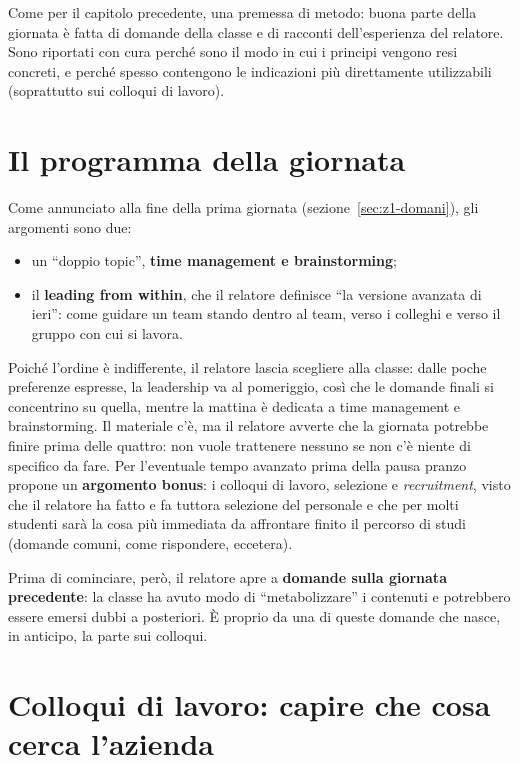 Come per il capitolo precedente, una premessa di metodo: buona parte della
giornata è fatta di domande della classe e di racconti dell'esperienza del
relatore. Sono riportati con cura perché sono il modo in cui i principi
vengono resi concreti, e perché spesso contengono le indicazioni più
direttamente utilizzabili (soprattutto sui colloqui di lavoro).

\section{Il programma della giornata}
\label{sec:z2-programma}

Come annunciato alla fine della prima giornata
(sezione~\ref{sec:z1-domani}), gli argomenti sono due:
\begin{itemize}
  \item un ``doppio topic'', \textbf{time management e brainstorming};
  \item il \textbf{leading from within}, che il relatore definisce ``la
        versione avanzata di ieri'': come guidare un team stando dentro al
        team, verso i colleghi e verso il gruppo con cui si lavora.
\end{itemize}
Poiché l'ordine è indifferente, il relatore lascia scegliere alla classe: dalle
poche preferenze espresse, la leadership va al pomeriggio, così che le domande
finali si concentrino su quella, mentre la mattina è dedicata a time
management e brainstorming. Il materiale c'è, ma il relatore avverte che la
giornata potrebbe finire prima delle quattro: non vuole trattenere nessuno se
non c'è niente di specifico da fare. Per l'eventuale tempo avanzato prima della
pausa pranzo propone un \textbf{argomento bonus}: i colloqui di lavoro,
selezione e \emph{recruitment}, visto che il relatore ha fatto e fa tuttora
selezione del personale e che per molti studenti sarà la cosa più immediata da
affrontare finito il percorso di studi (domande comuni, come rispondere,
eccetera).

Prima di cominciare, però, il relatore apre a \textbf{domande sulla giornata
precedente}: la classe ha avuto modo di ``metabolizzare'' i contenuti e
potrebbero essere emersi dubbi a posteriori. È proprio da una di queste domande
che nasce, in anticipo, la parte sui colloqui.

\section{Colloqui di lavoro: capire che cosa cerca l'azienda}
\label{sec:z2-colloqui}

